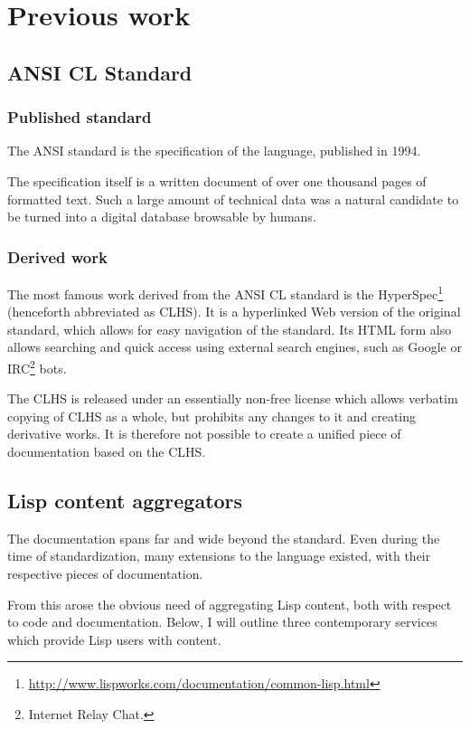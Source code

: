 \section{Previous work}

\subsection{ANSI CL Standard}

\subsubsection{Published standard}

The ANSI \cl{} standard\cite{ANSI:1994:standard} is the specification of the \cl{} language, published in 1994.

The specification itself is a written document of over one thousand pages of formatted text. Such a large amount of technical data was a natural candidate to be turned into a digital database browsable by humans.
\subsubsection{Derived work}
The most famous work derived from the ANSI CL standard is the \cl{} HyperSpec\footnote{\url{http://www.lispworks.com/documentation/common-lisp.html}} (henceforth abbreviated as CLHS). It is a hyperlinked Web version of the original standard, which allows for easy navigation of the standard. Its HTML form also allows searching and quick access using external search engines, such as Google or IRC\footnote{Internet Relay Chat.} bots.

The CLHS is released under an essentially non-free license which allows verbatim copying of CLHS as a whole, but prohibits any changes to it and creating derivative works. It is therefore not possible to create a unified piece of \cl{} documentation based on the CLHS.

\subsection{Lisp content aggregators}

The \cl{} documentation spans far and wide beyond the \cl{} standard. Even during the time of \cl{} standardization, many extensions to the language existed, with their respective pieces of documentation.

From this arose the obvious need of aggregating Lisp content, both with respect to code and documentation. Below, I will outline three contemporary services which provide Lisp users with content.

